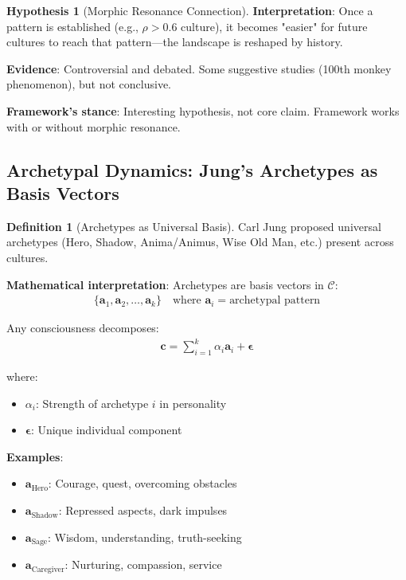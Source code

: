 \documentclass[11pt,a4paper]{article}
\theoremstyle{definition}
\newtheorem{definition}{Definition}[section]
\newtheorem{hypothesis}{Hypothesis}[section]
\theoremstyle{remark}
\newcommand{\CC}{\mathcal{C}}
\newcommand{\cc}{\mathbf{c}}
\begin{document}
\begin{enumerate}
\begin{hypothesis}[Morphic Resonance Connection]
\textbf{Interpretation}: Once a pattern is established (e.g., \(\rho > 0.6\) culture), it becomes "easier" for future cultures to reach that pattern—the landscape is reshaped by history.

\textbf{Evidence}: Controversial and debated. Some suggestive studies (100th monkey phenomenon), but not conclusive.

\textbf{Framework's stance}: Interesting hypothesis, not core claim. Framework works with or without morphic resonance.
\end{hypothesis}

\subsection{Archetypal Dynamics: Jung's Archetypes as Basis Vectors}

\begin{definition}[Archetypes as Universal Basis]
Carl Jung proposed universal archetypes (Hero, Shadow, Anima/Animus, Wise Old Man, etc.) present across cultures.

\textbf{Mathematical interpretation}: Archetypes are basis vectors in \(\CC\):
\begin{align}
\{\mathbf{a}_1, \mathbf{a}_2, \ldots, \mathbf{a}_k\} \quad \text{where } \mathbf{a}_i = \text{archetypal pattern}
\end{align}

Any consciousness decomposes:
\begin{align}
\cc = \sum_{i=1}^k \alpha_i \mathbf{a}_i + \boldsymbol{\epsilon}
\end{align}

where:
\begin{itemize}
    \item \(\alpha_i\): Strength of archetype \(i\) in personality
    \item \(\boldsymbol{\epsilon}\): Unique individual component
\end{itemize}

\textbf{Examples}:
\begin{itemize}
    \item \(\mathbf{a}_{\text{Hero}}\): Courage, quest, overcoming obstacles
    \item \(\mathbf{a}_{\text{Shadow}}\): Repressed aspects, dark impulses
    \item \(\mathbf{a}_{\text{Sage}}\): Wisdom, understanding, truth-seeking
    \item \(\mathbf{a}_{\text{Caregiver}}\): Nurturing, compassion, service
\end{itemize}


\end{definition}
\end{enumerate}
\end{document}
